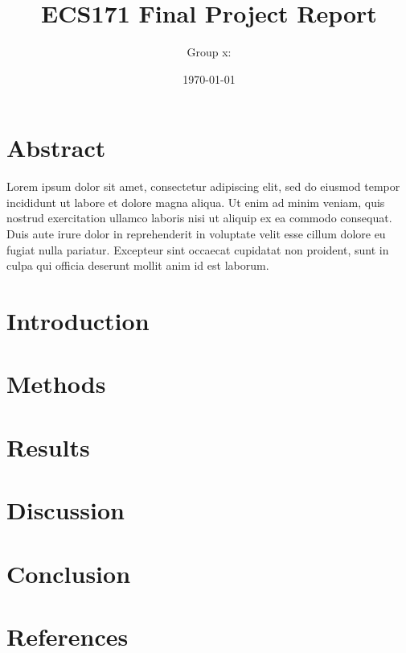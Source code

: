 \documentclass[a4paper]{article}
\title{\textbf{ECS171 Final Project Report}}
\author{Group x: }
\date{\today}
\begin{document}
\maketitle

\section*{Abstract}
Lorem ipsum dolor sit amet, consectetur adipiscing elit, sed do eiusmod tempor incididunt ut labore et dolore magna aliqua. Ut enim ad minim veniam, quis nostrud exercitation ullamco laboris nisi ut aliquip ex ea commodo consequat. Duis aute irure dolor in reprehenderit in voluptate velit esse cillum dolore eu fugiat nulla pariatur. Excepteur sint occaecat cupidatat non proident, sunt in culpa qui officia deserunt mollit anim id est laborum.

\section*{Introduction}


\section*{Methods}


\section*{Results}


\section*{Discussion}


\section*{Conclusion}


\section*{References}


 
\end{document}

